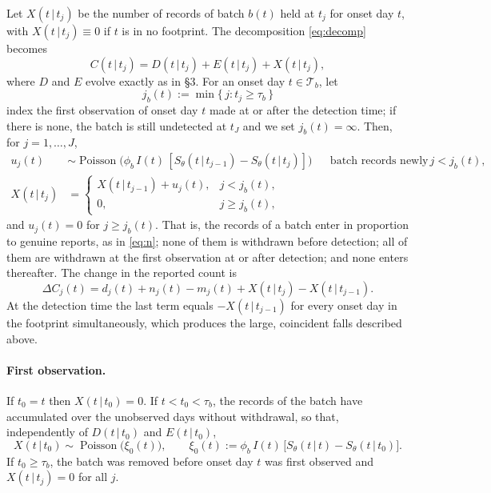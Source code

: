 \documentclass[11pt,a4paper]{article}
\newcommand{\given}{\,|\,}
\newcommand{\pois}{\operatorname{Poisson}}
\newcommand{\Tb}{\mathcal{T}_b}
\begin{document}
Let $X(t\given t_j)$ be the number of records of batch $b(t)$ held at $t_j$ for
onset day $t$, with $X(t\given t_j)\equiv 0$ if $t$ is in no footprint. The
decomposition \eqref{eq:decomp} becomes
\begin{equation}\label{eq:decompbatch}
C(t\given t_j) = D(t\given t_j) + E(t\given t_j) + X(t\given t_j),
\end{equation}
where $D$ and $E$ evolve exactly as in \S3. For an onset day $t\in\Tb$, let
\begin{equation}
j_b(t) := \min\{\,j : t_j\ge\tau_b\,\}
\end{equation}
index the first observation of onset day $t$ made at or after the detection
time; if there is none, the batch is still undetected at $t_J$ and we set
$j_b(t)=\infty$. Then, for $j=1,\dots,J$,
\begin{align}
u_j(t) &\sim \pois\bigl(\phi_b\, I(t)\,[S_\theta(t\given t_{j-1})-S_\theta(t\given t_j)]\bigr)
 && \text{batch records newly entered, if } j<j_b(t), \label{eq:u}\\
X(t\given t_j) &=
\begin{cases}
X(t\given t_{j-1}) + u_j(t), & j<j_b(t),\\
0, & j\ge j_b(t),
\end{cases} \label{eq:X}
\end{align}
and $u_j(t)=0$ for $j\ge j_b(t)$. That is, the records of a batch enter in
proportion to genuine reports, as in \eqref{eq:n}; none of them is withdrawn
before detection; all of them are withdrawn at the first observation at or
after detection; and none enters thereafter. The change in the reported count
is
\begin{equation}\label{eq:deltaCbatch}
\Delta C_j(t) = d_j(t) + n_j(t) - m_j(t) + X(t\given t_j) - X(t\given t_{j-1}).
\end{equation}
At the detection time the last term equals $-X(t\given t_{j-1})$ for every
onset day in the footprint simultaneously, which produces the large,
coincident falls described above.

\paragraph{First observation.} If $t_0=t$ then $X(t\given t_0)=0$. If
$t<t_0<\tau_b$, the records of the batch have accumulated over the unobserved
days without withdrawal, so that, independently of $D(t\given t_0)$ and
$E(t\given t_0)$,
\begin{equation}\label{eq:initialX}
X(t\given t_0)\sim\pois\bigl(\xi_0(t)\bigr),\qquad
\xi_0(t) := \phi_b\,I(t)\,\bigl[S_\theta(t\given t)-S_\theta(t\given t_0)\bigr].
\end{equation}
If $t_0\ge\tau_b$, the batch was removed before onset day $t$ was first
observed and $X(t\given t_j)=0$ for all $j$.
\end{document}
